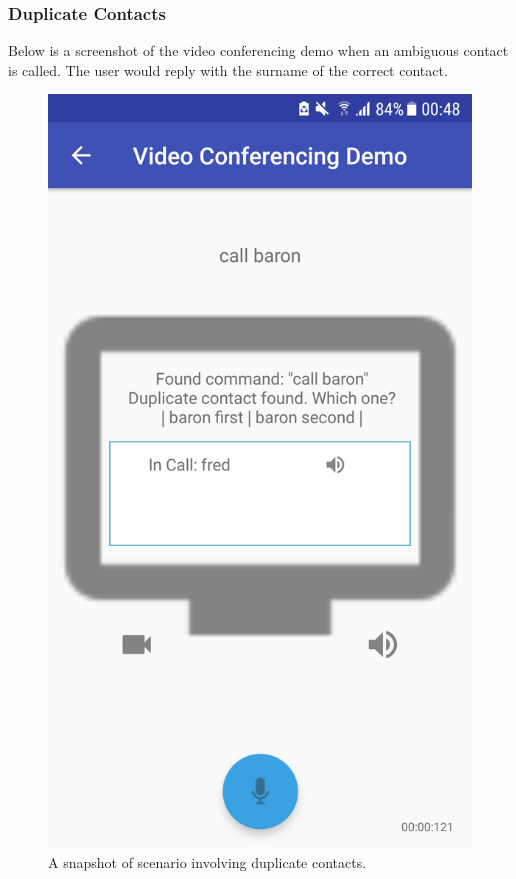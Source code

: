 \documentclass[11pt]{article}
\begin{document}
\subsubsection{Duplicate Contacts}
\label{appendix:duplicate-contacts}
Below is a screenshot of the video conferencing demo when an ambiguous contact is called. The user would reply with the surname of the correct contact.

\begin{center}
\begin{figure}[H]
\begin{center}
  \includegraphics[scale=0.25]{duplicate-contacts.png}
  \caption{A snapshot of scenario involving duplicate contacts.}
  \label{fig:snapshot-duplicate-contacts}
  \end{center}
\end{figure}
\end{center}
\end{document}
